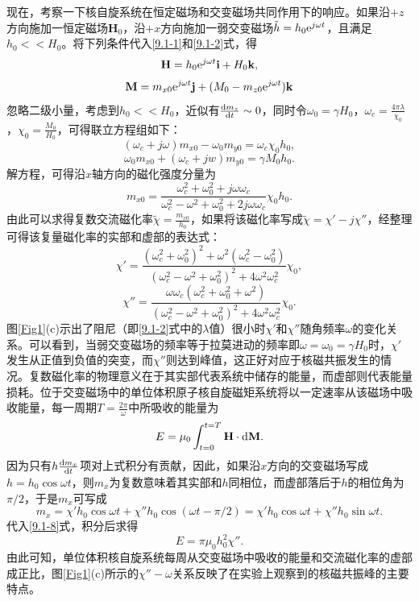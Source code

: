 \documentclass[a4paper]{article}
\begin{document}
现在，考察一下核自旋系统在恒定磁场和交变磁场共同作用下的响应。如果沿$+z$方向施加一恒定磁场$\mathbf{H}_0$，沿$+x$方向施加一弱交变磁场$\tilde{h}=h_0{\rm e}^{j\omega t}$，且满足$h_0<<H_0$。将下列条件代入\ref{9.1-1}和\ref{9.1-2}式，得
$$\mathbf{H}=h_0{\rm e}^{j\omega t}\mathbf{i}+H_0\mathbf{k},$$
$$\mathbf{M}=m_{x0}{\rm e}^{j\omega t}\mathbf{j}+(M_0-m_{z0}{\rm e}^{j\omega t})\mathbf{k}$$
忽略二级小量，考虑到$h_0<<H_0$，近似有$\frac{{\rm d}m_z}{{\rm d}t}\sim0$，同时令$\omega_0=\gamma H_0$，$\omega_c=\frac{4\pi\lambda}{\chi_0}$，$\chi_0=\frac{M_0}{H_0}$，可得联立方程组如下：
\begin{equation}(\omega_c+j\omega)m_{x0}-\omega_0m_{y0}=\omega_c\chi_0h_0,\label{9.1-5}\end{equation}
\begin{equation}\omega_0m_{x0}+(\omega_c+jw)m_{y0}=\gamma M_0h_0.\label{9.1-6}\end{equation}
解方程，可得沿$x$轴方向的磁化强度分量为
\begin{equation}m_{x0}=\frac{\omega_c^2+\omega_0^2+j\omega\omega_c}{\omega_c^2-\omega^2+\omega_0^2+2j\omega\omega_c}\chi_0h_0.\label{9.1-7}\end{equation}
由此可以求得复数交流磁化率$\tilde{\chi}=\frac{m_{x0}}{h_0}$，如果将该磁化率写成$\tilde{\chi}=\chi'-j\chi''$，经整理可得该复量磁化率的实部和虚部的表达式：
\begin{equation}\chi'=\frac{(\omega_c^2+\omega_0^2)^2+\omega^2(\omega_c^2-\omega_0^2)}{(\omega_c^2-\omega^2+\omega_0^2)^2+4\omega^2\omega_c^2}\chi_0,\label{9.1-8}\end{equation}
\begin{equation}\chi''=\frac{\omega\omega_c(\omega_c^2+\omega_0^2+\omega^2)}{(\omega_c^2-\omega^2+\omega_0^2)^2+4\omega^2\omega_c^2}\chi_0.\label{9.1-9}\end{equation}
图\ref{Fig1}(c)示出了阻尼（即\ref{9.1-2}式中的$\lambda$值）很小时$\chi'$和$\chi''$随角频率$\omega$的变化关系。可以看到，当弱交变磁场的频率等于拉莫进动的频率即$\omega=\omega_0=\gamma H_0$时，$\chi'$发生从正值到负值的突变，而$\chi''$则达到峰值，这正好对应于核磁共振发生的情况。复数磁化率的物理意义在于其实部代表系统中储存的能量，而虚部则代表能量损耗。位于交变磁场中的单位体积原子核自旋磁矩系统将以一定速率从该磁场中吸收能量，每一周期$T=\frac{2\pi}{\omega}$中所吸收的能量为
\begin{equation}E=\mu_0\int_{t=0}^{t=T}\mathbf{H}\cdot{\rm d}\mathbf{M}.\label{9.1-10}\end{equation}
因为只有$h\frac{{\rm d}m_x}{{\rm d}t}$项对上式积分有贡献，因此，如果沿$x$方向的交变磁场写成$h=h_0\cos\omega t$，则$m_x$为复数意味着其实部和$h$同相位，而虚部落后于$h$的相位角为$\pi/2$，于是$m_x$可写成
$$m_x=\chi'h_0\cos\omega t+\chi''h_0\cos(\omega t-\pi/2)=\chi'h_0\cos\omega t+\chi''h_0\sin\omega t.$$
代入\ref{9.1-8}式，积分后求得
\begin{equation}E=\pi\mu_0h_0^2\chi''.\label{9.1-11}\end{equation}
由此可知，单位体积核自旋系统每周从交变磁场中吸收的能量和交流磁化率的虚部成正比，图\ref{Fig1}(c)所示的$\chi''-\omega$关系反映了在实验上观察到的核磁共振峰的主要特点。
\end{document}
